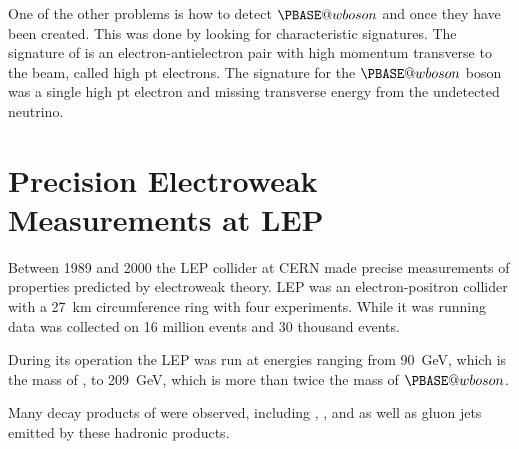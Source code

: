 \documentclass[fleqn]{NotesClass}
\makeatletter
\newcommand{\Pwboson}{\ensuremath{\PBASE@wboson}}
\newcommand{\PW}{\Pwboson}
\makeatother
\begin{document}
    One of the other problems is how to detect \PW{} and \PZ{} once they have been created.
    This was done by looking for characteristic signatures.
    The signature of \PZ{} is an electron-antielectron pair with high momentum transverse to the beam, called high pt electrons.
    The signature for the \PW{} boson was a single high pt electron and missing transverse energy from the undetected neutrino.
    
    \section{Precision Electroweak Measurements at LEP}
    Between 1989 and 2000 the LEP collider at CERN made precise measurements of properties predicted by electroweak theory.
    LEP was an electron-positron collider with a \qty{27}{\kilo\metre} circumference ring with four experiments.
    While it was running data was collected on 16 million \PZ{} events and 30 thousand \PWpm{} events.
    
    During its operation the LEP was run at energies ranging from \qty{90}{\giga\electronvolt}, which is the mass of \PZ{}, to \qty{209}{\giga\electronvolt}, which is more than twice the mass of \PW.
    
    Many decay products of \PZ{} were observed, including \Pe\APe, \Pmu\APmu, and \Pq\APq{} as well as gluon jets emitted by these hadronic products.
    
\end{document}
